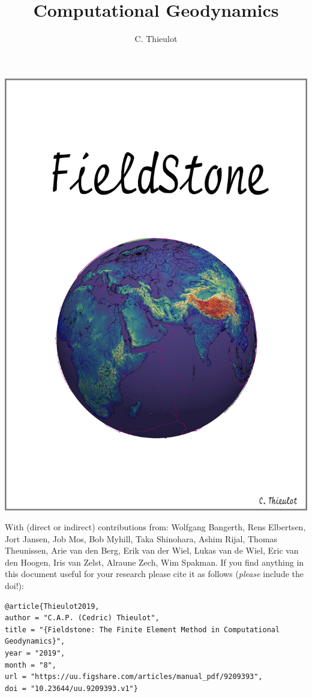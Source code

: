 \documentclass[a4paper]{article}
\title{Computational Geodynamics}
\author{C. Thieulot}
\begin{document}
\thispagestyle{empty}
\includegraphics[width=0.95\linewidth]{images/frontpage/frontpage.png}

{\scriptsize With (direct or indirect) contributions from: 
Wolfgang Bangerth, 
Rens Elbertsen,
Jort Jansen,
Job Mos, 
Bob Myhill,
Taka Shinohara, 
Ashim Rijal,
Thomas Theunissen,
Arie van den Berg,
Erik van der Wiel, 
Lukas van de Wiel, 
Eric van den Hoogen, 
Iris van Zelst,
Alraune Zech, 
Wim Spakman.}
\newpage
If you find anything in this document useful for your research please cite it 
as follows ({\it please} include the doi!):

\begin{verbatim}
@article{Thieulot2019,
author = "C.A.P. (Cedric) Thieulot",
title = "{Fieldstone: The Finite Element Method in Computational Geodynamics}",
year = "2019",
month = "8",
url = "https://uu.figshare.com/articles/manual_pdf/9209393",
doi = "10.23644/uu.9209393.v1"}
\end{verbatim}
\end{document}
